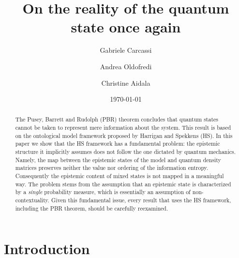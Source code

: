 \documentclass[twocolumn,prl,floatfix,superscriptaddress]{revtex4-2}
\begin{document}
\title{On the reality of the quantum state once again}
\author{Gabriele Carcassi}
\author{Andrea Oldofredi}
\author{Christine Aidala}
\vspace{2mm}

\date{\today}


\begin{abstract}
The Pusey, Barrett and Rudolph (PBR) theorem concludes that quantum states cannot be taken to represent mere information about the system. This result is based on the ontological model framework proposed by Harrigan and Spekkens (HS). In this paper we show that the HS framework has a fundamental problem: the epistemic structure it implicitly assumes does not follow the one dictated by quantum mechanics. Namely, the map between the epistemic states of the model and quantum density matrices preserves neither the value nor ordering of the information entropy. Consequently the epistemic content of mixed states is not mapped in a meaningful way. The problem stems from the assumption that an epistemic state is characterized by a \emph{single} probability measure, which is essentially an assumption of non-contextuality. Given this fundamental issue, every result that uses the HS framework, including the PBR theorem, should be carefully reexamined.
\end{abstract}

\maketitle

\section{Introduction}
\end{document}
